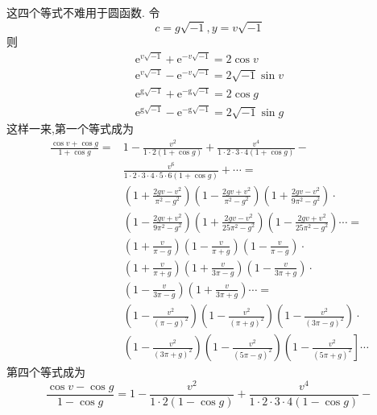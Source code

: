 这四个等式不难用于圆函数. 令
\[
c=g \sqrt{-1}, y=v \sqrt{-1}
\]
则
\[
\begin{gathered}
\mathrm{e}^{v \sqrt{-1}}+\mathrm{e}^{-v \sqrt{-1}}=2 \cos v \\
\mathrm{e}^{v \sqrt{-1}}-\mathrm{e}^{-v \sqrt{-1}}=2 \sqrt{-1} \sin v \\
\mathrm{e}^{\mathrm{g} \sqrt{-1}}+\mathrm{e}^{-\mathrm{g} \sqrt{-1}}=2 \cos g \\
\mathrm{e}^{\mathrm{g} \sqrt{-1}}-\mathrm{e}^{-\mathrm{g} \sqrt{-1}}=2 \sqrt{-1} \sin g
\end{gathered}
\]
这样一来,第一个等式成为
\[
\begin{aligned}
\frac{\cos v+\cos g}{1+\cos g}= & 1-\frac{v^{2}}{1 \cdot 2(1+\cos g)}+\frac{v^{4}}{1 \cdot 2 \cdot 3 \cdot 4(1+\cos g)}- \\
& \frac{v^{6}}{1 \cdot 2 \cdot 3 \cdot 4 \cdot 5 \cdot 6(1+\cos g)}+\cdots= \\
& \left(1+\frac{2 g v-v^{2}}{\pi^{2}-g^{2}}\right)\left(1-\frac{2 g v+v^{2}}{\pi^{2}-g^{2}}\right)\left(1+\frac{2 g v-v^{2}}{9 \pi^{2}-g^{2}}\right) \cdot \\
& \left(1-\frac{2 g v+v^{2}}{9 \pi^{2}-g^{2}}\right)\left(1+\frac{2 g v-v^{2}}{25 \pi^{2}-g^{2}}\right)\left(1-\frac{2 g v+v^{2}}{25 \pi^{2}-g^{2}}\right) \cdots= \\
& \left(1+\frac{v}{\pi-g}\right)\left(1-\frac{v}{\pi+g}\right)\left(1-\frac{v}{\pi-g}\right) \cdot \\
& \left(1+\frac{v}{\pi+g}\right)\left(1+\frac{v}{3 \pi-g}\right)\left(1-\frac{v}{3 \pi+g}\right) \cdot \\
& \left(1-\frac{v}{3 \pi-g}\right)\left(1+\frac{v}{3 \pi+g}\right) \cdots= \\
& \left(1-\frac{v^{2}}{(\pi-g)^{2}}\right)\left(1-\frac{v^{2}}{(\pi+g)^{2}}\right)\left(1-\frac{v^{2}}{(3 \pi-g)^{2}}\right) \cdot \\
& \left(1-\frac{v^{2}}{(3 \pi+g)^{2}}\right)\left(1-\frac{v^{2}}{(5 \pi-g)^{2}}\right)\left(1-\frac{v^{2}}{(5 \pi+g)^{2}}\right] \cdots
\end{aligned}
\]
第四个等式成为
\[
\frac{\cos v-\cos g}{1-\cos g}=1-\frac{v^{2}}{1 \cdot 2(1-\cos g)}+\frac{v^{4}}{1 \cdot 2 \cdot 3 \cdot 4(1-\cos g)}-
\]
